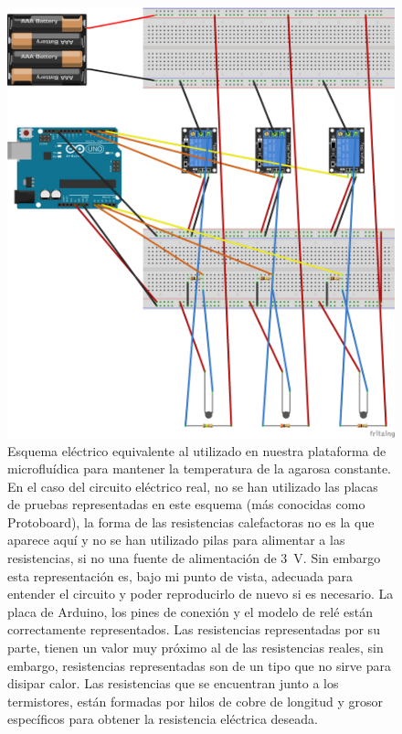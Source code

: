 \begin{figure}[H]
    \begin{center}
         \includegraphics[angle=-90,width=1\textwidth]{3_metodologia/tfm_02_bb.png}
    \end{center}
    \caption{\small Esquema eléctrico equivalente al utilizado en nuestra plataforma de microfluídica para mantener la temperatura de la agarosa constante. En el caso del circuito eléctrico real, no se han utilizado las placas de pruebas representadas en este esquema (más conocidas como Protoboard), la forma de las resistencias calefactoras no es la que aparece aquí y no se han utilizado pilas para alimentar a las resistencias, si no una fuente de alimentación de 3~V. Sin embargo esta representación es, bajo mi punto de vista, adecuada para entender el circuito y poder reproducirlo de nuevo si es necesario. La placa de Arduino, los pines de conexión y el modelo de relé están correctamente representados. Las resistencias representadas por su parte, tienen un valor muy próximo al de las resistencias reales, sin embargo, resistencias representadas son de un tipo que no sirve para disipar calor. Las resistencias que se encuentran junto a los termistores, están formadas por hilos de cobre de longitud y grosor específicos para obtener la resistencia eléctrica deseada.}
    \label{fig:esquema_electrico}
\end{figure}

